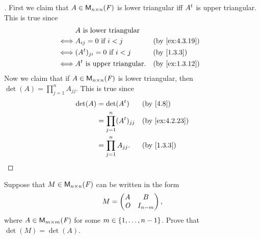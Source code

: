 \begin{proof}[]
  First we claim that \(A \in \ms[n][n][\F]\) is lower triangular iff \({A}^{t}\) is upper triangular.
  This is true since
  \begin{align*}
         & A \text{ is lower triangular}                            \\
    \iff & A_{i j} = 0 \text{ if } i < j        &  & \by{ex:4.3.19} \\
    \iff & (\tp{A})_{j i} = 0 \text{ if } i < j &  & \by{1.3.3}     \\
    \iff & \tp{A} \text{ is upper triangular}.  &  & \by{ex:1.3.12}
  \end{align*}
  Now we claim that if \(A \in \ms[n][n][\F]\) is lower triangular, then \(\det(A) = \prod_{j = 1}^n A_{j j}\).
  This is true since
  \begin{align*}
    \det(A) & = \det(\tp{A})                   &  & \by{4.8}       \\
            & = \prod_{j = 1}^n (\tp{A})_{j j} &  & \by{ex:4.2.23} \\
            & = \prod_{j = 1}^n A_{j j}.       &  & \by{1.3.3}
  \end{align*}
\end{proof}

\begin{ex}\label{ex:4.3.20}
  Suppose that \(M \in \ms[n][n][\F]\) can be written in the form
  \[
    M = \begin{pmatrix}
      A   & B         \\
      \mathit{O} & I_{n - m}
    \end{pmatrix},
  \]
  where \(A \in \ms[m][m][\F]\) for some \(m \in \left\lbrace1, \dots, n - 1\right\rbrace\).
  Prove that \(\det(M) = \det(A)\).
\end{ex}

